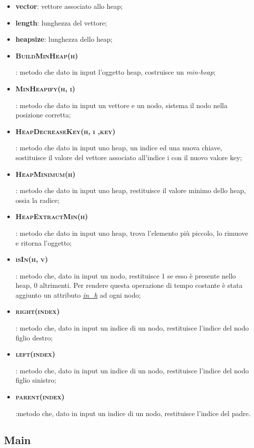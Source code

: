 \begin{itemize}
    \item \textbf{vector}: vettore associato allo heap;
    \item \textbf{length}: lunghezza del vettore;
    \item \textbf{heapsize}: lunghezza dello heap;
    \item \hypertarget{buildminheap}{\textbf{\textsc{BuildMinHeap(h)}}}: metodo che dato in input l'oggetto heap, costruisce un \textit{min-heap};
    \item \hypertarget{minheapify}{\textbf{\textsc{MinHeapify(h, i)}}}: metodo che dato in input un vettore e un nodo, sistema il nodo nella posizione corretta;
    \item \hypertarget{heapdecreasekey}{\textbf{\textsc{HeapDecreaseKey(h, i ,key)}}}: metodo che dato in input uno heap, un indice ed una nuova chiave, sostituisce il valore del vettore associato all'indice i con il nuovo valore key;
    \item \hypertarget{heapminimum}{\textbf{\textsc{HeapMinimum(h)}}}: metodo che dato in input uno heap, restituisce il valore minimo dello heap, ossia la radice;
    \item \hypertarget{heapextractmin}{\textbf{\textsc{HeapExtractMin(h)}}}: metodo che dato in input uno heap, trova l'elemento più piccolo, lo rimuove e ritorna l'oggetto;
    \item \hypertarget{isin}{\textbf{\textsc{isIn(h, v)}}}: metodo che, dato in input un nodo, restituisce 1 se esso è presente nello heap, 0 altrimenti. Per rendere questa operazione di tempo costante è stata aggiunto un attributo \hyperlink{inh}{\textit{in\_h}} ad ogni nodo;
    \item \hypertarget{right}{\textbf{\textsc{right(index)}}}: metodo che, dato in input un indice di un nodo, restituisce l'indice del nodo figlio destro;
    \item \hypertarget{left}{\textbf{\textsc{left(index)}}}: metodo che, dato in input un indice di un nodo, restituisce l'indice del nodo figlio sinistro;
    \item \hypertarget{parent}{\textbf{\textsc{parent(index)}}}:metodo che, dato in input un indice di un nodo, restituisce l'indice del padre.
\end{itemize}


\subsection{Main}
\label{main}

